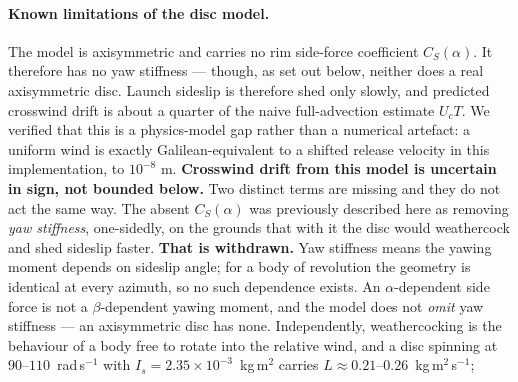 \documentclass[11pt,letterpaper]{article}
\begin{document}
\paragraph{Known limitations of the disc model.} The model is axisymmetric and
carries no rim side-force coefficient $C_S(\alpha)$. It therefore has no yaw
stiffness --- though, as set out below, neither does a real axisymmetric disc.
Launch sideslip is therefore shed only slowly, and predicted crosswind drift is
about a quarter of the naive full-advection estimate $U_c T$. We verified that
this is a physics-model gap rather than a numerical artefact: a uniform wind is
exactly Galilean-equivalent to a shifted release velocity in this
implementation, to $10^{-8}$ m.
\textbf{Crosswind drift from this model is uncertain in sign, not bounded
below.} Two distinct terms are missing and they do not act the same way. The absent
$C_S(\alpha)$ was previously described here as removing \emph{yaw stiffness}, one-sidedly,
on the grounds that with it the disc would weathercock and shed sideslip faster.
\textbf{That is withdrawn.} Yaw stiffness means the yawing moment depends on sideslip
angle; for a body of revolution the geometry is identical at every azimuth, so no such
dependence exists. An $\alpha$-dependent side force is not a $\beta$-dependent yawing
moment, and the model does not \emph{omit} yaw stiffness --- an axisymmetric disc has
none. Independently, weathercocking is the behaviour of a body free to rotate into the
relative wind, and a disc spinning at $90$--$110$~rad\,s$^{-1}$ with
$I_s = 2.35\times10^{-3}$~kg\,m$^2$ carries $L \approx 0.21$--$0.26$~kg\,m$^2$\,s$^{-1}$;
\end{document}
